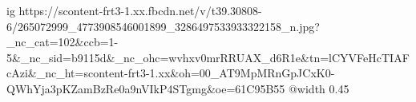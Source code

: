 
 
 
 
 

\ifcmt
  ig https://scontent-frt3-1.xx.fbcdn.net/v/t39.30808-6/265072999_4773908546001899_3286497533933322158_n.jpg?_nc_cat=102&ccb=1-5&_nc_sid=b9115d&_nc_ohc=wvhxv0mrRRUAX_d6R1e&tn=lCYVFeHcTIAFcAzi&_nc_ht=scontent-frt3-1.xx&oh=00_AT9MpMRnGpJCxK0-QWhYja3pKZamBzRe0a9nVIkP4STgmg&oe=61C95B55
  @width 0.45
\fi
